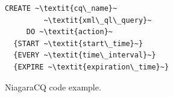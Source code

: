 
\begin{figure}[!h]
\begin{lstlisting}
CREATE ~\textit{cq\_name}~
         ~\textit{xml\_ql\_query}~
     DO ~\textit{action}~
  {START ~\textit{start\_time}~}
  {EVERY ~\textit{time\_interval}~}
  {EXPIRE ~\textit{expiration\_time}~}
\end{lstlisting}
\vspace*{-4mm}
\caption{\label{fig:Niagra}NiagaraCQ code example.}
\end{figure}

